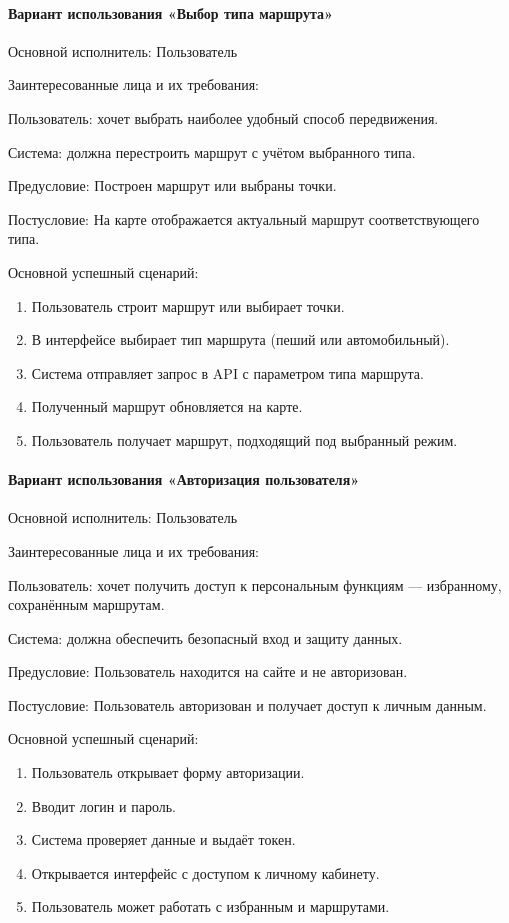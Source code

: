 \paragraph{Вариант использования «Выбор типа маршрута»}

Основной исполнитель: Пользователь

Заинтересованные лица и их требования:

Пользователь: хочет выбрать наиболее удобный способ передвижения.

Система: должна перестроить маршрут с учётом выбранного типа.

Предусловие: Построен маршрут или выбраны точки.

Постусловие: На карте отображается актуальный маршрут соответствующего типа.

Основной успешный сценарий:
\begin{enumerate}
	\item Пользователь строит маршрут или выбирает точки.
	\item В интерфейсе выбирает тип маршрута (пеший или автомобильный).
	\item Система отправляет запрос в API с параметром типа маршрута.
	\item Полученный маршрут обновляется на карте.
	\item Пользователь получает маршрут, подходящий под выбранный режим.
\end{enumerate}

\paragraph{Вариант использования «Авторизация пользователя»}

Основной исполнитель: Пользователь

Заинтересованные лица и их требования:

Пользователь: хочет получить доступ к персональным функциям — избранному, сохранённым маршрутам.

Система: должна обеспечить безопасный вход и защиту данных.

Предусловие: Пользователь находится на сайте и не авторизован.

Постусловие: Пользователь авторизован и получает доступ к личным данным.

Основной успешный сценарий:
\begin{enumerate}
	\item Пользователь открывает форму авторизации.
	\item Вводит логин и пароль.
	\item Система проверяет данные и выдаёт токен.
	\item Открывается интерфейс с доступом к личному кабинету.
	\item Пользователь может работать с избранным и маршрутами.
\end{enumerate}

